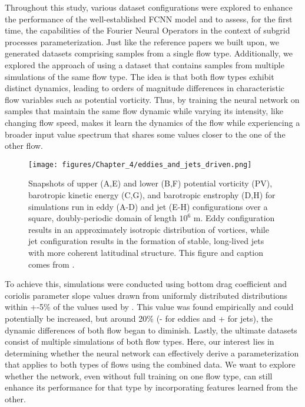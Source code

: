 
Throughout this study, various dataset configurations were explored to enhance the performance of the well-established FCNN model and to assess, for the first time, the capabilities of the Fourier Neural Operators in the context of subgrid processes parameterization. Just like the reference papers we built upon, we generated datasets comprising samples from a single flow type. Additionally, we explored the approach of using a dataset that contains samples from multiple simulations of the same flow type. The idea is that both flow types exhibit distinct dynamics, leading to orders of magnitude differences in characteristic flow variables such as potential vorticity. Thus, by training the neural network on samples that maintain the same flow dynamic while varying its intensity, like changing flow speed, makes it learn the dynamics of the flow while experiencing a broader input value spectrum that shares some values closer to the one of the other flow. 


\begin{figure}[!b]
	\vspace{-2em}
    \centering
    \texttt{[image: figures/Chapter\_4/eddies\_and\_jets\_driven.png]}
    \caption{Snapshots of upper (A,E) and lower (B,F) potential vorticity (PV), barotropic kinetic energy (C,G), and barotropic enstrophy (D,H) for simulations run in eddy (A-D) and jet (E-H) configurations over a square, doubly-periodic domain of length $10^6$ m. Eddy configuration results in an approximately isotropic distribution of vortices, while jet configuration results in the formation of stable, long-lived jets with more coherent latitudinal structure. This figure and caption comes from \cite{Benchmarking}.}
    \label{C4 - FIG - Vizualization of an eddy and jet flow}
\end{figure}

\newpage

To achieve this, simulations were conducted using bottom drag coefficient and coriolis parameter slope values drawn from uniformly distributed distributions within +-5\% of the values used by \cite{Benchmarking}. This value was found empirically and could potentially be increased, but around 20\% (- for eddies and + for jets), the dynamic differences of both flow began to diminish. Lastly, the ultimate datasets consist of multiple simulations of both flow types. Here, our interest lies in determining whether the neural network can effectively derive a parameterization that applies to both types of flows using the combined data. We want to explore whether the network, even without full training on one flow type, can still enhance its performance for that type by incorporating features learned from the other.\\

